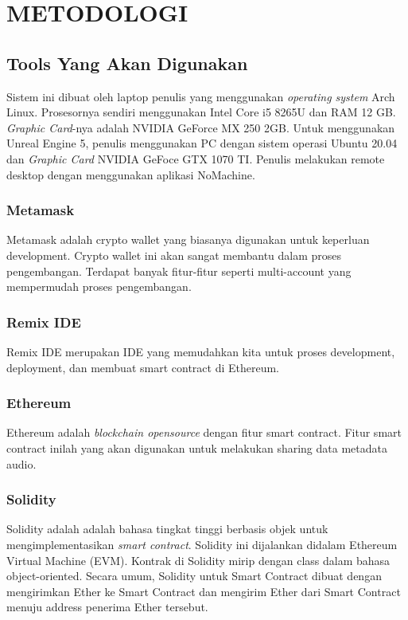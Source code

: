 \chapter{METODOLOGI}


\section{Tools Yang Akan Digunakan}

Sistem ini dibuat oleh laptop penulis yang menggunakan \emph{operating system} Arch Linux. Prosesornya sendiri menggunakan Intel Core i5
8265U dan RAM 12 GB. \emph{Graphic Card}-nya adalah NVIDIA GeForce MX 250 2GB. Untuk menggunakan Unreal Engine 5, penulis menggunakan PC
dengan sistem operasi Ubuntu 20.04 dan \emph{Graphic Card} NVIDIA GeFoce GTX 1070 TI. Penulis melakukan remote desktop dengan menggunakan aplikasi
NoMachine.

\subsection{Metamask}
Metamask adalah crypto wallet yang biasanya digunakan untuk keperluan development. Crypto wallet ini
akan sangat membantu dalam proses pengembangan. Terdapat banyak fitur-fitur seperti multi-account yang mempermudah proses pengembangan.

\subsection{Remix IDE}
Remix IDE merupakan IDE yang memudahkan kita untuk proses development, deployment, dan membuat smart contract di Ethereum.

\subsection{Ethereum}
Ethereum adalah \emph{blockchain opensource} dengan fitur smart contract. Fitur smart contract inilah yang akan digunakan untuk
melakukan sharing data metadata audio.

\subsection{Solidity}
Solidity adalah adalah bahasa tingkat tinggi berbasis objek untuk mengimplementasikan
\emph{smart contract}. Solidity ini dijalankan didalam Ethereum Virtual Machine (EVM).
Kontrak di Solidity mirip dengan class dalam bahasa object-oriented.  Secara umum, Solidity untuk Smart Contract dibuat dengan mengirimkan
Ether ke Smart Contract dan mengirim Ether dari Smart Contract menuju address penerima Ether tersebut.

